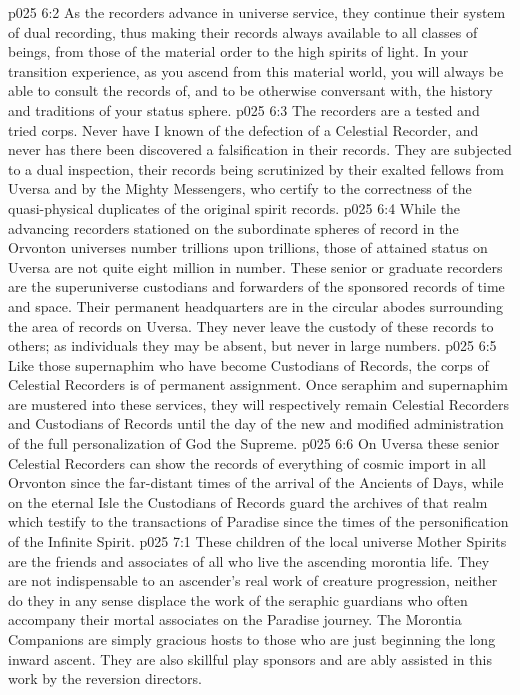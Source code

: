 \vs p025 6:2 As the recorders advance in universe service, they continue their system of dual recording, thus making their records always available to all classes of beings, from those of the material order to the high spirits of light. In your transition experience, as you ascend from this material world, you will always be able to consult the records of, and to be otherwise conversant with, the history and traditions of your status sphere.
\vs p025 6:3 The recorders are a tested and tried corps. Never have I known of the defection of a Celestial Recorder, and never has there been discovered a falsification in their records. They are subjected to a dual inspection, their records being scrutinized by their exalted fellows from Uversa and by the Mighty Messengers, who certify to the correctness of the quasi\hyp{}physical duplicates of the original spirit records.
\vs p025 6:4 While the advancing recorders stationed on the subordinate spheres of record in the Orvonton universes number trillions upon trillions, those of attained status on Uversa are not quite eight million in number. These senior or graduate recorders are the superuniverse custodians and forwarders of the sponsored records of time and space. Their permanent headquarters are in the circular abodes surrounding the area of records on Uversa. They never leave the custody of these records to others; as individuals they may be absent, but never in large numbers.
\vs p025 6:5 Like those supernaphim who have become Custodians of Records, the corps of Celestial Recorders is of permanent assignment. Once seraphim and supernaphim are mustered into these services, they will respectively remain Celestial Recorders and Custodians of Records until the day of the new and modified administration of the full personalization of God the Supreme.
\vs p025 6:6 On Uversa these senior Celestial Recorders can show the records of everything of cosmic import in all Orvonton since the far\hyp{}distant times of the arrival of the Ancients of Days, while on the eternal Isle the Custodians of Records guard the archives of that realm which testify to the transactions of Paradise since the times of the personification of the Infinite Spirit.
\vs p025 7:1 These children of the local universe Mother Spirits are the friends and associates of all who live the ascending morontia life. They are not indispensable to an ascender’s real work of creature progression, neither do they in any sense displace the work of the seraphic guardians who often accompany their mortal associates on the Paradise journey. The Morontia Companions are simply gracious hosts to those who are just beginning the long inward ascent. They are also skillful play sponsors and are ably assisted in this work by the reversion directors.
